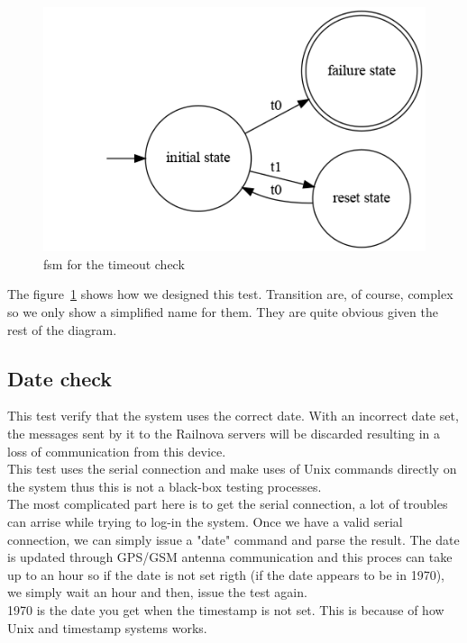 \documentclass[12pt]{article}
\begin{document}
\begin{figure}
    \centering
    \includegraphics[scale=0.6]{graph/TimeoutCheck}
    \caption{\gls{fsm} for the timeout check}
    \label{timeoutcheck}
\end{figure}

The figure~\ref{timeoutcheck} shows how we designed this test. Transition are, of course, complex so we only show a simplified name for them. They are quite obvious given the rest of the diagram.

\subsection{Date check}

This test verify that the system uses the correct date. With an incorrect date set, the messages sent by it to the Railnova servers will be discarded resulting in a loss of communication from this device.\\

This test uses the serial connection and make uses of Unix commands directly on the system thus this is not a black-box testing processes.\\

The most complicated part here is to get the serial connection, a lot of troubles can arrise while trying to log-in the system. Once we have a valid serial connection, we can simply issue a "date" command and parse the result. The date is updated through GPS/GSM antenna communication and this proces can take up to an hour so if the date is not set rigth (if the date appears to be in 1970), we simply wait an hour and then, issue the test again.\\

1970 is the date you get when the timestamp is not set. This is because of how Unix and timestamp systems works.
\end{document}
